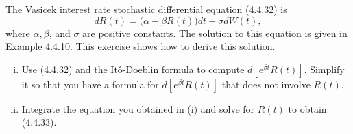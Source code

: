 \documentclass[11pt]{article}
\newcounter{question}[section]
\begin{document}
    \begin{hwquestion}
        The Vasicek interest rate stochastic differential equation (4.4.32) is
        \[
            d R(t)
            =
            \big(
                \alpha - \beta R(t)
            \big) dt
            +
            \sigma d W(t),
        \]
        where $\alpha, \beta$, and $\sigma$ are positive constants. The solution to this
        equation is given in Example 4.4.10. This exercise shows how to derive this
        solution.

        \vspace{2mm}

        \begin{enumerate}[(i), nolistsep]
            \item Use (4.4.32) and the It\^{o}-Doeblin formula to compute $d[ e^{\beta t}
            R(t) ]$. Simplify it so that you have a formula for $d[ e^{\beta t} R(t) ]$
            that does not involve $R(t)$.
            \item Integrate the equation you obtained in (i) and solve for $R(t)$ to
            obtain (4.4.33).
        \end{enumerate}
    \end{hwquestion}
\end{document}
